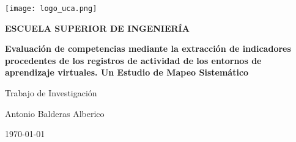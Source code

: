 

\begin{titlepage}

  \begin{center}

    \texttt{[image: logo\_uca.png]} \\
    
    \vspace{2.0cm}
    
    \LARGE{\textbf{ESCUELA SUPERIOR DE INGENIERÍA}} \\
    
    \vspace{1.0cm}
    
    \Large{\textbf{Evaluación de competencias mediante la extracción de indicadores procedentes de los registros de actividad de los entornos de aprendizaje virtuales. Un Estudio de Mapeo Sistemático}} \\
    
    \vspace{3.0cm}
    
    \Large{Trabajo de Investigación} \\
    
    \vspace{2.0cm}
    
    \Large{Antonio Balderas Alberico} \\
  
    \vspace{0.5cm}

    \large{\today}
    
  \end{center}
\end{titlepage}
